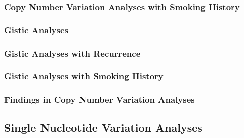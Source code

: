 \documentclass[11pt,a4paper,onecolumn,oneside]{report}
\begin{document}
            \subsubsection{Copy Number Variation Analyses with Smoking History}

            \subsubsection{Gistic Analyses}

            \subsubsection{Gistic Analyses with Recurrence}

            \subsubsection{Gistic Analyses with Smoking History}

            \subsubsection{Findings in Copy Number Variation Analyses}

        \subsection{Single Nucleotide Variation Analyses}
\end{document}
